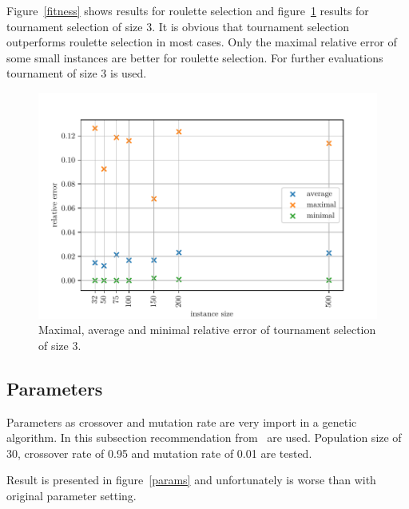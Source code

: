 \documentclass{article}
\begin{document}
Figure~\ref{fitness} shows results for roulette selection
and figure~\ref{tournament} results for tournament selection of size 3.
It is obvious that tournament selection outperforms roulette selection in
most cases.
Only the maximal relative error of some small instances are better for
roulette selection.
For further evaluations tournament of size 3 is used.

\begin{figure}[ht]
\vskip 0.2in
\begin{center}
\centerline{\includegraphics[width=\columnwidth]{tournament}}
\caption{Maximal, average and minimal relative error of tournament selection
of size 3.}
\label{tournament}
\end{center}
\vskip -0.2in
\end{figure}

\subsection{Parameters}

Parameters as crossover and mutation rate are very import in a genetic
algorithm.
In this subsection recommendation from~\cite{schaffer1989} are used.
Population size of 30, crossover rate of 0.95 and mutation rate of 0.01
are tested.

Result is presented in figure~\ref{params}
and unfortunately is worse than with original parameter setting.
\end{document}

